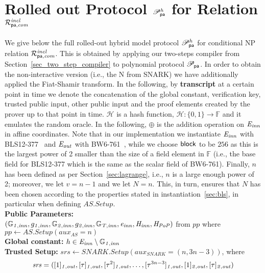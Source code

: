 \section{Rolled out Protocol $\mathscr{P}_{\mathsf{pa}}^{h}$ for Relation $\mathcal{R}^{\mathit{incl}}_{\mathsf{pa},\mathit{com}}$}
\label{sec:rolled_out}

\noindent We give below the full rolled-out hybrid model protocol $\mathscr{P}_{\mathsf{pa}}^{h}$ for conditional NP relation $\mathcal{R}^{\mathit{incl}}_{\mathsf{pa},\mathit{com}}$. This is obtained by applying 
our two-steps compiler from Section~\ref{sec_two_step_compiler} to polynomial protocol $\mathscr{P}_{\mathsf{pa}}$. In order to obtain the non-interactive version 
(i.e., the N from SNARK) we have additionally applied the Fiat-Shamir transform. In the following, by \textbf{transcript} at a certain point in time we denote the concatenation 
of the global constant, verification key, trusted public input, other public input and the proof elements created by the prover up to that point in time.
\noindent $\mathcal{H}$ is a hash function, $\mathcal{H}: \{0, 1\} \rightarrow \mathbb{F}$ and it emulates the random oracle.  
In the following, $\oplus$ is the addition operation on $\mathit{E}_{\mathit{inn}}$ in affine coordinates. Note that in our implementation we instantiate 
$\mathit{E}_{\mathit{inn}}$ with BLS12-377~\cite{zexe} and $\mathit{E}_{\mathit{out}}$ with BW6-761~\cite{BW6}, while we choose $\mathsf{block}$ to be $256$ as this is the largest power of 2 smaller 
than the size of a field element in $\mathbb{F}$ (i.e., the base field for BLS12-377 which is the same as the scalar field of BW6-761). 
Finally, $n$ has been defined as per Section~\ref{sec:lagrange}, i.e., $n$ is a large enough power of 2; 
moreover, we let $v= n-1$ and we let $N = n$. This, in turn, ensures that $N$ has been chosen according to the properties stated in 
instantiation~\ref{sec:bls}, in particular when defining $\mathit{AS.Setup}$. \\

\noindent \textbf{Public Parameters:} \\
$(\mathbb{G}_{\mathit{1,inn}}, g_{\mathit{1,inn}}, \mathbb{G}_{\mathit{2,inn}}, g_{\mathit{2,inn}}, \mathbb{G}_{\mathit{T,inn}}, \mathit{e}_{\mathit{inn}}, \mathit{H}_{\mathit{inn}}, \mathit{H}_{\mathit{PoP}})$ from $\mathit{pp}$ 
where $\mathit{pp} \leftarrow \mathit{AS.Setup}(\mathit{aux_{\mathit{AS}}}= n)$ \\

\noindent \textbf{Global constant:} $h \in \mathit{E}_{\mathit{inn}} \setminus \mathbb{G}_{\mathit{1,inn}}$ \\ 

\noindent \textbf{Trusted Setup:} $\mathit{srs} \leftarrow \mathit{SNARK.Setup}(\mathit{aux_{\mathit{SNARK}}} = (n, 3n-3))$,  
where $$\mathit{srs} =([1]_{\mathit{1,out}}, [\tau]_{\mathit{1,out}}, [\tau^2]_{\mathit{1,out}}, \ldots, [\tau^{3n-3}]_{\mathit{1,out}}, [1]_{\mathit{2,out}}, [\tau]_{\mathit{2,out}})$$\\

